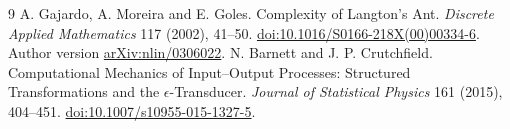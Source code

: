 \documentclass[11pt]{article}
\theoremstyle{definition}\newtheorem{definition}[theorem]{Definition}
\begin{document}
\begin{thebibliography}{9}
 A. Gajardo, A. Moreira and E. Goles.
Complexity of Langton's Ant.
\emph{Discrete Applied Mathematics} 117 (2002), 41--50.
\href{https://doi.org/10.1016/S0166-218X(00)00334-6}{doi:10.1016/S0166-218X(00)00334-6}.
Author version \href{https://arxiv.org/abs/nlin/0306022}{arXiv:nlin/0306022}.
 N. Barnett and J. P. Crutchfield.
Computational Mechanics of Input--Output Processes: Structured Transformations
and the $\epsilon$-Transducer.
\emph{Journal of Statistical Physics} 161 (2015), 404--451.
\href{https://doi.org/10.1007/s10955-015-1327-5}{doi:10.1007/s10955-015-1327-5}.
\end{thebibliography}
\end{document}
